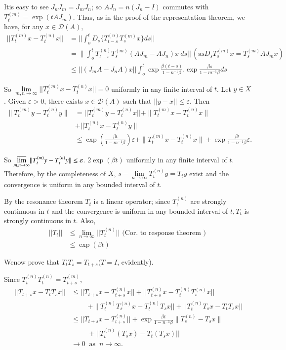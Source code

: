 It\pageoriginale is easy to see $J_n J_m = J_m J_n$; so $A J_n =n(J_n - I)$
commutes with $T^{(m)}_t = \exp (t A J_m)$. Thus, as in the proof of
the representation theorem, we have, for any $x \in \mathscr{D}(A)$, 
{\fontsize{10pt}{12pt}\selectfont
\begin{align*}
 || T^{(m)}_t x- T^{(n)}_t x || &= || \int^t_o D_s \bigg\{
 T^{(n)}_{t-s} T^{(m)}_s x \bigg\} ds ||\\ 
 &= \| \int_o^t T^{(n)}_{t-s} T^{(m)}_s (A J_m -A J_n )x~ ds ||\,
 (\text{as} D_s T^{(m)}_s x= T^{(m)}_s AJ_m x)\\ 
 &\le || (J_m A- J_n A)x || \int^t_o \exp
 \frac{\beta(t-s)}{1-n^{-1}\beta}. \exp \frac{\beta s}{1-m^{-1}\beta}
 ds 
\end{align*}}\relax

So $\lim\limits_{m,n \to \infty} ||T^{(m)}_t x- T^{(n)}_t x || =0$
uniformly in any finite interval of $t$. Let $y \in X$. Given
$\varepsilon > 0$, there exists $x \in \mathscr{D} (A)$ such that
$||y-x || \le \varepsilon$. Then 
\begin{align*}
 \| T^{(m)}_t y- T^{(n)}_t y \| &= || T^{(m)}_t y-T^{(n)}_t x || +
 \|T^{(m)}_t x- T^{(n)}_t x \| \\ 
 &+ || T^{(n)}_t x - T^{(n)}_t y \| \\
 &\le \exp \left(\frac{\beta t}{1-m^{-1} \beta}\right) \varepsilon +
 \|T^{(m)}_t x- T^{(n)}_t x \| +\exp \frac{\beta t}{1-n^{-1}\beta} \varepsilon. 
\end{align*} 

So ${\varlimsup\limits_{m,n \to \infty}} || T^{(m)}_t y- T^{(n)}_t y
|| \le \varepsilon$. $2 \exp (\beta t)$ uniformly in any finite
interval of $t$. Therefore, by the completeness of $X$,
$s-\lim\limits_{n \to \infty} T^{(n)}_t y = T_t y$ exist and the
convergence is uniform in any bounded interval of $t$. 
 
By the resonance theorem $T_t$ is a linear operator; since $T^{(n)}_t$
are strongly continuous in $t$ and the convergence is uniform in any
bounded interval of $t, T_t$ is strongly continuous in $t$. Also, 
\begin{align*}
 || T_t || &\le \lim_{n \to \infty} || T^{(n)}_t || \text{ (Cor. to
  response theorem ) }\\ 
 &\le \exp (\beta t)
 \end{align*} 
 
We\pageoriginale now prove that $T_t T_s = T_{t+s} (T =I$, evidently).
 
Since $T^{(n)}_t T^{(n)}_t =T^{(m)}_{t+s}$,
\begin{align*}
 || T_{t+s}x - T_t T_s x || &\le || T_{t+s}x- T^{(n)}_{t+s} x || + ||
 T^{(n)}_{t+s}x -T^{(n)}_t T^{(n)}_s x ||\\ 
 &\hspace{1cm} + \|T^{(n)}_t T^{(n)}_s x-
 T^{(n)}_t T_s x || + || T^{(n)}_t T_s x- T_t T_s x || \\ 
 & \le || T_{t+s} x- T^{(n)}_{t+s} || + \exp \frac{\beta t}{1-n^{-1}
  \beta}\| T^{(n)}_s- T_s x \|\\ 
 & \hspace{1cm} + || T^{(n)}_t (T_s x)- T_t (T_s x)||\\ 
 & \to 0 ~\text{ as }~ n \to \infty. 
\end{align*} 
 
